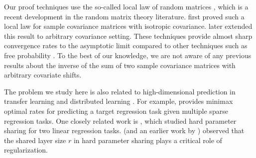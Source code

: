 Our proof techniques use the so-called local law of random matrices \cite{erdos2017dynamical}, which is a recent development in the random matrix theory literature.
\citet{isotropic} first proved such a local law for sample covariance matrices with isotropic covariance.
\citet{Anisotropic} later extended this result to arbitrary covariance setting.
These techniques provide almost sharp convergence rates to the asymptotic limit compared to other techniques such as free probability \cite{nica2006lectures}.
To the best of our knowledge, we are not aware of any previous results about the inverse of the sum of two sample covariance matrices with arbitrary covariate shifts.

The problem we study here is also related to high-dimensional prediction in transfer learning \cite{li2020transfer,bastani2020predicting} and distributed learning \cite{dobriban2018high}.
For example, \citet{li2020transfer} provides minimax optimal rates for predicting a target regression task given multiple sparse regression tasks.
One closely related work is \citet{WZR20}, which studied hard parameter sharing for two linear regression tasks.
\citet{WZR20} (and an earlier work by \citet{KD12}) observed that the shared layer size $r$ in hard parameter sharing plays a critical role of regularization.



